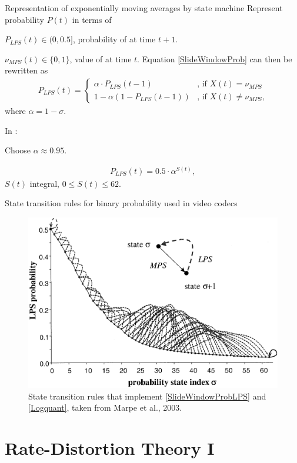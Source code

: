 \begin{frame}{Representation of exponentially moving averages by state machine}
Represent probability $P(t)$ in terms of 
\bit
\item $P_{LPS}(t)\in (0,0.5]$, probability of  at time $t+1$.
\item $\nu_{MPS}(t)\in\{0,1\}$, value of  at time $t$. 
\eit
Equation \eqref{SlideWindowProb} can then be rewritten as
\begin{align}\label{SlideWindowProbLPS}
P_{LPS}(t)=\begin{cases}\alpha\cdot P_{LPS}(t-1) & \text{, if $X(t)=\nu_{MPS}$} \\ 1-\alpha(1-P_{LPS}(t-1)) & \text{, if $X(t)\neq \nu_{MPS}$,}\end{cases}
\end{align}
where
$\alpha=1-\sigma$. 

In : 
\bit
\item Choose $\alpha \approx 0.95$. 
\item {} 
\begin{align}\label{Logquant}
P_{LPS}(t)=0.5\cdot \alpha^{S(t)},
\end{align}
$S(t)$ integral, $0\leq S(t)\leq 62$. 
\eit
\end{frame}

\begin{frame}{State transition rules for binary probability used in video codecs}
\begin{figure}
\includegraphics[width=.49\textwidth]{LosslessIII/CabacStateTransition.png}
\captionsetup{labelformat=empty}
\caption{State transition rules that implement \eqref{SlideWindowProbLPS} and \eqref{Logquant}, taken from Marpe et al., 2003.}
\end{figure}

\end{frame}



\section{Rate-Distortion Theory I}


